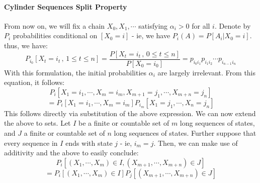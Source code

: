 \documentclass[12pt,a4paper]{article}
\newcommand{\1}[1]{\mathbbm{1}\left\{ #1 \right\}}
\begin{document}
\paragraph{Cylinder Sequences Split Property} From now on, we will fix a chain $X_0, X_1, \cdots$ satisfying $\alpha_i > 0$ for all $i$. Denote by $P_i$ probabilities conditional on $[X_0 = i]$ - ie, we have $P_i(A) = P[A_i | X_0 = i]$. thus, we have:
$$
	P_{i_0}\left[X_t = i_t \,,\, 1 \leq t \leq n\right] =
	\frac{P\left[X_t = i_t \,,\, 0 \leq t \leq n\right]}{P[X_0 = i_{0}]} =
	p_{i_0i_1} p_{i_1i_2} \cdots p_{i_{n-1}i_n}
$$
With this formulation, the initial probabilities $\alpha_i$ are largely irrelevant. From this equation, it follows:
$$
	P_i\left[X_1 = i_1, \cdots, X_m = i_m, X_{m+1} = j_1, \cdots, X_{m + n} = j_n\right]
$$
$$
	=
	P_i\left[X_1 = i_1, \cdots, X_m = i_m\right]
	P_{i_m}\left[X_1 = j_1, \cdots, X_n = j_n\right]
$$
This follows directly via substitution of the above expression. We can now extend the above to sets. Let $I$ be a finite or countable set of $m$ long sequences of states, and $J$ a finite or countable set of $n$ long sequences of states. Further suppose that every sequence in $I$ ends with state $j$ - ie, $i_m = j$. Then, we can make use of additivity and the above to easily conclude:
$$
	P_i\left[(X_1, \cdots, X_m) \in I, (X_{m+1}, \cdots, X_{m + n}) \in J\right]
$$
$$
	=
	P_i\left[(X_1, \cdots, X_m) \in I\right]
	P_j\left[(X_{m+1}, \cdots, X_{m + n}) \in J\right]
$$
\end{document}
